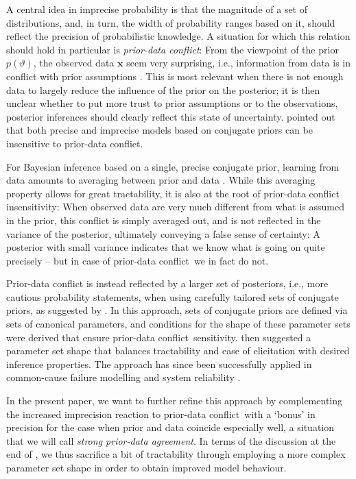 \documentclass[runningheads,a4paper]{llncs}
\def\pdc{prior-data conflict}
\renewcommand{\vec}[1]{{\bm #1}}
\begin{document}
A central idea in imprecise probability is that the magnitude of a set of distributions,
and, in turn, the width of probability ranges based on it,
should reflect the precision of probabilistic knowledge.
A situation for which this relation should hold in particular is \emph{\pdc}:
From the viewpoint of the prior $p(\vartheta)$, the observed data $\vec{x}$ seem very surprising,
i.e., information from data is in conflict with prior assumptions \cite{2006:evans}. %
This is most relevant when there is not enough data to largely reduce the influence of the prior on the posterior;
it is then unclear whether to put more trust to prior assumptions or to the observations,
posterior inferences should clearly reflect this state of uncertainty.
\cite{Walter2009a} pointed out that
both precise and imprecise models based on conjugate priors can be insensitive to prior-data conflict.

For Bayesian inference based on a single, precise conjugate prior,
learning from data amounts to averaging between prior and data
\cite[\S~1.2.3.1]{2013:diss-gw}.
While this averaging property allows for great tractability,
it is also at the root of prior-data conflict insensitivity: 
When observed data are very much different from what is assumed in the prior,
this conflict is simply averaged out,
and is not reflected in the variance of the posterior,
ultimately conveying a false sense of certainty:
A posterior with small variance indicates that we know what is going on quite precisely -- but in case of \pdc\ we in fact do not.

Prior-data conflict is instead reflected by a larger set of posteriors,
i.e., more cautious probability statements,
when using carefully tailored sets of conjugate priors,
as suggested by \cite{Walter2009a}.
In this approach, sets of conjugate priors are defined via sets of canonical parameters,
and conditions for the shape of these parameter sets were derived that ensure \pdc\ sensitivity.
\cite{Walter2009a} then suggested a parameter set shape
that balances tractability and ease of elicitation
with desired inference properties.
The approach has since been successfully applied in common-cause failure modelling \cite{Troffaes2014a}
and system reliability \cite{2015:walter}.

In the present paper, we want to further refine this approach
by complementing the increased imprecision reaction to \pdc\
with a `bonus' in precision for the case when prior and data coincide especially well,
a situation that we will call \emph{strong prior-data agreement}.
In terms of the discussion at the end of \cite[\S~3.1.4]{2013:diss-gw},
we thus sacrifice a bit of tractability through employing a more complex parameter set shape
in order to obtain improved model behaviour.%
\end{document}
